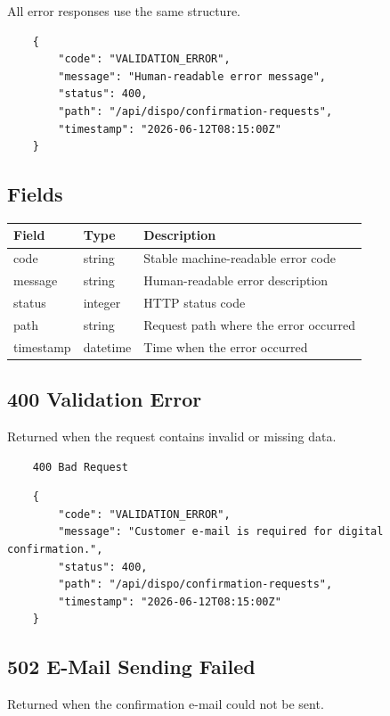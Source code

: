 \documentclass[a4paper,11pt]{article}
\begin{document}
All error responses use the same structure.

\begin{lstlisting}
	{
		"code": "VALIDATION_ERROR",
		"message": "Human-readable error message",
		"status": 400,
		"path": "/api/dispo/confirmation-requests",
		"timestamp": "2026-06-12T08:15:00Z"
	}
\end{lstlisting}

\subsection{Fields}

\begin{longtable}{p{3cm}p{2cm}p{8cm}}
	\toprule
	Field & Type & Description \\
	\midrule
	code & string & Stable machine-readable error code \\
	message & string & Human-readable error description \\
	status & integer & HTTP status code \\
	path & string & Request path where the error occurred \\
	timestamp & datetime & Time when the error occurred \\
	\bottomrule
\end{longtable}

\subsection{400 Validation Error}

Returned when the request contains invalid or missing data.

\begin{lstlisting}
	400 Bad Request
\end{lstlisting}

\begin{lstlisting}
	{
		"code": "VALIDATION_ERROR",
		"message": "Customer e-mail is required for digital confirmation.",
		"status": 400,
		"path": "/api/dispo/confirmation-requests",
		"timestamp": "2026-06-12T08:15:00Z"
	}
\end{lstlisting}

\subsection{502 E-Mail Sending Failed}

Returned when the confirmation e-mail could not be sent.
\end{document}
